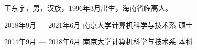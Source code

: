 \documentclass[macfonts,master]{njuthesis}
\begin{document}

\backmatter
\begin{resume}
\begin{authorinfo}
\noindent 王东宇，男，汉族，1996年3月出生，海南省临高人。
\end{authorinfo}
\begin{education}
\item[2018年9月 --- 2021年6月] 南京大学计算机科学与技术系 \hfill 硕士
\item[2014年9月 --- 2018年6月] 南京大学计算机科学与技术系 \hfill 本科
\end{education}
\begin{publications}
\item
\end{publications}
\begin{projects}
\item
\end{projects}
\end{resume}

\makelicense

\end{document}
